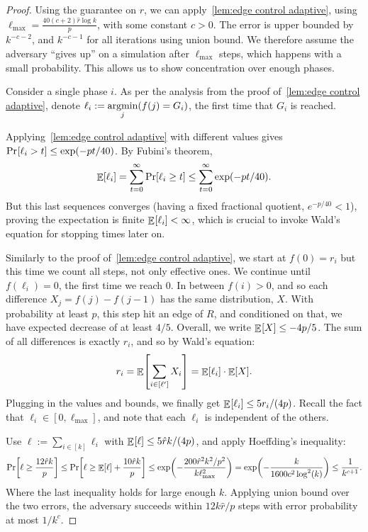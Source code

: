 \documentclass[letter,11pt]{article}
\begin{document}
\begin{proof}
    Using the guarantee on $r$, we can apply~\cref{lem:edge control adaptive}, using $\ell_{\max} = \frac{40(c+2) \hat{r} \log k}{p}$, with some constant $c > 0$. The error is upper bounded by $k^{-c-2}$, and $k^{-c-1}$ for all iterations using union bound.
    We therefore assume the adversary ``gives up'' on a simulation after $\ell_{\max}$ steps, which happens with a small probability. This allows us to show concentration over enough phases. 
	
    Consider a single phase $i$. As per the analysis from the proof of~\cref{lem:edge control adaptive}, denote $\ell_i := \argmin{j} \left(f(j) = G_i\right)$, the first time that $G_i$ is reached.

    Applying~\cref{lem:edge control adaptive} with different values gives $\Prob{}{\ell_i > t} \leq \exp\left(-pt/40\right)$. By Fubini's theorem,
    \[
        \Expc{}{\ell_i} 
        = \sum_{t=0}^{\infty} \Prob{}{\ell_i \geq t} 
        \leq \sum_{t=0}^{\infty} \exp\left(-pt/40\right) .
    \]
    But this last sequences converges (having a fixed fractional quotient, $e^{-p/40} < 1$), proving the expectation is finite $\Expc{}{\ell_i} < \infty$, which is crucial to invoke Wald's equation for stopping times later on. 
    
    Similarly to the proof of~\cref{lem:edge control adaptive}, we start at $f(0) = r_i$ but this time we count all steps, not only effective ones.
    We continue until $f(\ell_i) = 0$, the first time we reach $0$. In between $f(i) > 0$, and so each difference $X_j = f(j)-f(j-1)$ has the same distribution, $X$. With probability at least $p$, this step hit an edge of $R$, and conditioned on that, we have expected decrease of at least $4/5$.
    Overall, we write $\Expc{}{X} \leq -4p/5$. The sum of all differences is exactly $r_i$, and so by Wald's equation:
    \[
        r_i = \Expc{}{\sum_{i\in[\ell']} X_i} = \Expc{}{\ell_i} \cdot \Expc{}{X} .
    \]
    Plugging in the values and bounds, we finally get $\Expc{}{\ell_i} \leq 5r_i/(4p)$. Recall the fact that $\ell_i \in[0,\ell_{\max}]$, and note that each $\ell_i$ is independent of the others.
    
    Use $\ell := \sum_{i\in[k]} \ell_i$ with $\Expc{}{\ell} \leq 5\hat{r}k/(4p)$, and apply Hoeffding's inequality:
    \[
        \Prob{}{\ell \geq \frac{12\hat{r}k}{p}}
        \leq \Prob{}{\ell \geq \Expc{}{\ell} + \frac{10\hat{r}k}{p}}
        \leq \exp\left(- \frac{200\hat{r}^2k^2/p^2}{k \ell_{\max}^2}\right) 
        = \exp\left(-\frac{k}{1600c^2 \log ^2 (k)}\right)
        \leq \frac{1}{k^{c+1}} .
    \]
    Where the last inequality holds for large enough $k$.
    Applying union bound over the two errors, the adversary succeeds within $12k\hat{r}/p$ steps with error probability at most $1/k^c$. 
\end{proof}
\end{document}
